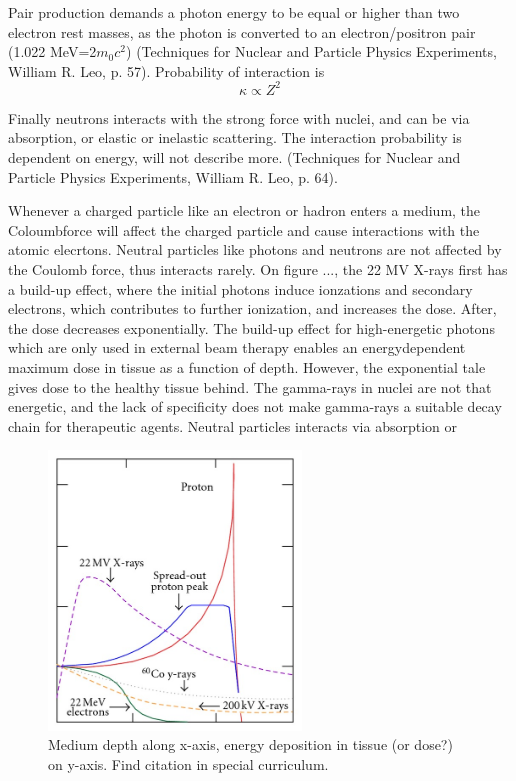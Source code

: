 \documentclass[a4paper,11pt,twoside]{book}
\begin{document}
Pair production demands a photon energy to be equal or higher than two electron rest  masses, as the photon is converted to an electron/positron pair (1.022 MeV=2$m_0c^2$) (Techniques for Nuclear and Particle Physics Experiments, William R. Leo, p. 57). Probability of interaction is \begin{equation}
    \kappa\propto Z^2
\end{equation}

Finally neutrons interacts with the strong force with nuclei, and can be via absorption, or elastic or inelastic scattering. The interaction probability is dependent on energy, will not describe more. (Techniques for Nuclear and Particle Physics Experiments, William R. Leo, p. 64). 

Whenever a charged particle like an electron or hadron enters a medium, the Coloumbforce will affect the charged particle and cause interactions with the atomic elecrtons. Neutral particles like photons and neutrons are not affected by the Coulomb force, thus interacts rarely. On figure ..., the 22 MV X-rays first has a build-up effect, where the initial photons induce ionzations and secondary electrons, which contributes to further ionization, and increases the dose. After, the dose decreases exponentially. 
The build-up effect for high-energetic photons which are only used in external beam therapy enables an energydependent maximum dose in tissue as a function of depth. However, the exponential tale gives dose to the healthy tissue behind. The gamma-rays in nuclei are not that energetic, and the lack of specificity does not make gamma-rays a suitable decay chain for therapeutic agents. Neutral particles interacts via absorption or   \\



\begin{figure}
    \centering
    \includegraphics[width=0.6\textwidth]{Theory/Bragg-peak-and-Spread-Out-Bragg-Peak-SOBP-for-a-proton-beam-in-comparison-with-photon.jpg}
    \caption{Medium depth along x-axis, energy deposition in tissue (or dose?) on y-axis. Find citation in special curriculum. }
    \label{fig:particle_interaction}
\end{figure}
\end{document}
